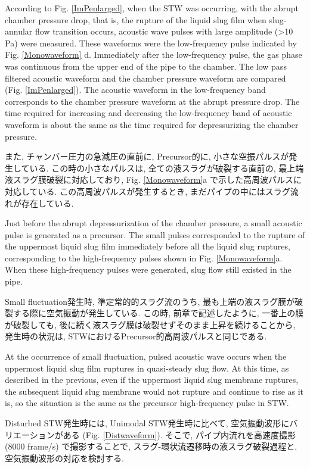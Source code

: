 \documentclass[12pt]{article}
\begin{document}
According to Fig. \ref {ImPenlarged}, when the STW was occurring, with the abrupt chamber pressure drop, that is, the rupture of the liquid slug film when slug-annular flow transition occurs, acoustic wave pulses with large amplitude (>10 Pa) were measured.
These waveforms were the low-frequency pulse indicated by Fig. \ref {Monowaveform} d.
Immediately after the low-frequency pulse, the gas phase was continuous from the upper end of the pipe to the chamber.
The low pass filtered acoustic waveform and the chamber pressure waveform are compared (Fig. \ref{ImPenlarged}).
The acoustic waveform in the low-frequency band corresponds to the chamber pressure waveform at the abrupt pressure drop.
The time required for increasing and decreasing the low-frequency band of acoustic waveform is about the same as the time required for depressurizing the chamber pressure.


また, チャンバー圧力の急減圧の直前に, Precursor的に, 小さな空振パルスが発生している. 
この時の小さなパルスは, 全ての液スラグが破裂する直前の, 最上端液スラグ膜破裂に対応しており, Fig. \ref{Monowaveform}a で示した高周波パルスに対応している. この高周波パルスが発生するとき, まだパイプの中にはスラグ流れが存在している. 

Just before the abrupt depressurization of the chamber pressure, a small acoustic pulse is generated as a precursor.
The small pulses corresponded to the rupture of the uppermost liquid slug film immediately before all the liquid slug ruptures, corresponding to the high-frequency pulses shown in Fig. \ref{Monowaveform}a.
When these high-frequency pulses were generated, slug flow still existed in the pipe.

Small fluctuation発生時, 準定常的的スラグ流のうち, 最も上端の液スラグ膜が破裂する際に空気振動が発生している. この時, 前章で記述したように, 一番上の膜が破裂しても, 後に続く液スラグ膜は破裂せずそのまま上昇を続けることから, 発生時の状況は, STWにおけるPrecursor的高周波パルスと同じである.

At the occurrence of small fluctuation, pulsed acoustic wave occurs when the uppermost liquid slug film ruptures in quasi-steady slug flow. 
At this time, as described in the previous, even if the uppermost liquid slug membrane ruptures, the subsequent liquid slug membrane would not rupture and continue to rise as it is, so the situation is the same as the precursor high-frequency pulse in STW.

Disturbed STW発生時には, Unimodal STW発生時に比べて, 空気振動波形にバリエーションがある (Fig. \ref{Distwaveform}). 
そこで, パイプ内流れを高速度撮影 (8000 frame/s) で撮影することで, スラグ-環状流遷移時の液スラグ破裂過程と, 空気振動波形の対応を検討する.
\end{document}
